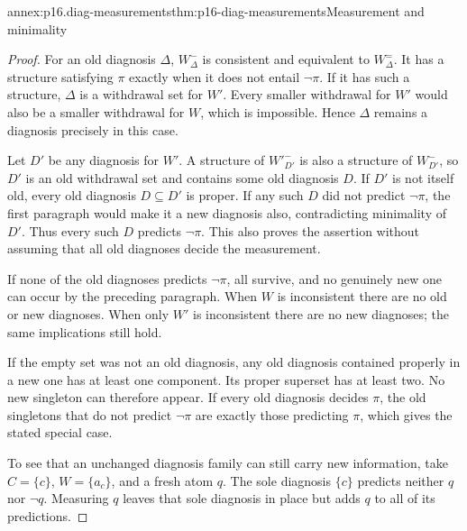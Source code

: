 \begin{annexitem}{annex:p16.diag-measurements}{thm:p16-diag-measurements}{Measurement and minimality}
\begin{proof}
For an old diagnosis \(\Delta\), \(W^-_\Delta\)
is consistent and equivalent to \(W^=_\Delta\).
It has a structure satisfying \(\pi\) exactly when
it does not entail \(\neg\pi\). If it has such
a structure, \(\Delta\) is a withdrawal set for
\(W'\). Every smaller withdrawal for \(W'\)
would also be a smaller withdrawal for \(W\),
which is impossible. Hence \(\Delta\) remains
a diagnosis precisely in this case.

Let \(D'\) be any diagnosis for \(W'\).
A structure of \(W'^-_{D'}\) is also a structure
of \(W^-_{D'}\), so \(D'\) is an old withdrawal
set and contains some old diagnosis \(D\).
If \(D'\) is not itself old, every old diagnosis
\(D\subseteq D'\) is proper. If any such \(D\)
did not predict \(\neg\pi\), the first paragraph
would make it a new diagnosis also, contradicting
minimality of \(D'\). Thus every such \(D\)
predicts \(\neg\pi\). This also proves the
assertion without assuming that all old diagnoses
decide the measurement.

If none of the old diagnoses predicts \(\neg\pi\),
all survive, and no genuinely new one can occur
by the preceding paragraph. When \(W\) is
inconsistent there are no old or new diagnoses.
When only \(W'\) is inconsistent there are no
new diagnoses; the same implications still hold.

If the empty set was not an old diagnosis, any
old diagnosis contained properly in a new one
has at least one component. Its proper superset
has at least two. No new singleton can therefore
appear. If every old diagnosis decides \(\pi\),
the old singletons that do not predict
\(\neg\pi\) are exactly those predicting \(\pi\),
which gives the stated special case.

To see that an unchanged diagnosis family can
still carry new information, take
\(C=\{c\}\), \(W=\{a_c\}\), and a fresh atom
\(q\). The sole diagnosis \(\{c\}\) predicts
neither \(q\) nor \(\neg q\). Measuring \(q\)
leaves that sole diagnosis in place but adds
\(q\) to all of its predictions.
\end{proof}
\end{annexitem}

